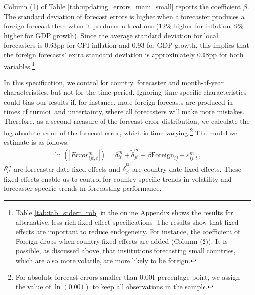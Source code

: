 Column (1) of Table \ref{tab:updating_errors_main_small} reports the coefficient $\beta$. The standard deviation of forecast errors is higher when a forecaster produces a foreign forecast than when it produces a local one (12\% higher for inflation, 9\% higher for GDP growth). Since the average standard deviation for local forecasters is 0.63pp for CPI inflation and 0.93 for GDP growth, this implies that the foreign forecasts' extra standard deviation is approximately 0.08pp for both variables.\footnote{Table \ref{tab:tab_stderr_rob} in the online Appendix shows the results for alternative, less rich fixed-effect specifications. The results show that fixed effects are important to reduce endogeneity. For instance, the coefficient of Foreign drops when country fixed effects are added (Column (2)). It is possible, as discussed above, that institutions forecasting small countries, which are also more volatile, are more likely to be foreign.}

{
	
}


In this specification, we control for country, forecaster and month-of-year characteristics, but not for the time period. Ignoring time-specific characteristics could bias our results if, for instance, more foreign forecasts are produced in times of turmoil and uncertainty, where all forecasters will make more mistakes. Therefore, as a second measure of the forecast error distribution, we calculate the log absolute value of the forecast error, which is time-varying.\footnote{For absolute forecast errors smaller than 0.001 percentage point, we assign the value of $\ln(0.001)$ to keep all observations in the sample.}  The model we estimate is as follows.
\begin{align}
	\ln(|Error_{ijt,t}^m|)= \delta_{it}^m +\tilde\delta_{jt}^m +  \beta \text{Foreign}_{ij} + \varepsilon_{ij,t}^m  \,, \label{eq:regModelFE}
\end{align}
$ \delta_{it}^m$ are forecaster-date fixed effects and $\tilde\delta_{jt}^m$ are country-date fixed effects. These fixed effects enable us to control for country-specific trends in volatility and forecaster-specific trends in forecasting performance.


